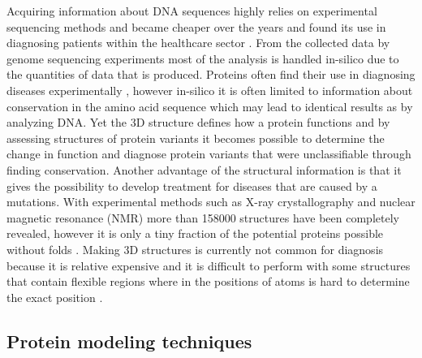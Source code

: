 Acquiring information about DNA sequences highly relies on experimental sequencing methods and became cheaper over the years \cite{} and found its use in diagnosing patients within the healthcare sector \cite{}.
From the collected data by genome sequencing experiments most of the analysis is handled in-silico due to the quantities of data that is produced. Proteins often find their use in diagnosing diseases experimentally \cite{}, however in-silico it is often limited to information about conservation in the amino acid sequence which may lead to identical results as by analyzing DNA.
Yet the 3D structure defines how a protein functions \cite{} and by assessing structures of protein variants it becomes possible to determine the change in function and diagnose protein variants that were unclassifiable through finding conservation.
Another advantage of the structural information is that it gives the possibility to develop treatment for diseases that are caused by a mutations. 
With experimental methods such as X-ray crystallography and nuclear magnetic resonance (NMR) more than 158000 structures \cite{} have been completely revealed, however it is only a tiny fraction of the potential proteins possible without folds \cite{}.
Making 3D structures is currently not common for diagnosis because it is relative expensive and it is difficult to perform with some structures that contain flexible regions where in the positions of atoms is hard to determine the exact position \cite{}.
\newpage

\subsection{Protein modeling techniques}

